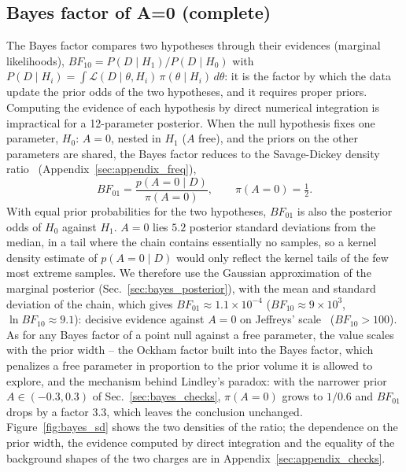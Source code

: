 \subsection{Bayes factor of A=0 (complete)}
The Bayes factor compares two hypotheses through their evidences (marginal likelihoods), $BF_{10}=P(D\mid H_1)/P(D\mid H_0)$ with $P(D\mid H_i)=\int\mathcal{L}(D\mid\theta,H_i)\,\pi(\theta\mid H_i)\,d\theta$: it is the factor by which the data update the prior odds of the two hypotheses, and it requires proper priors. Computing the evidence of each hypothesis by direct numerical integration is impractical for a 12-parameter posterior. When the null hypothesis fixes one parameter, $H_0$: $A=0$, nested in $H_1$ ($A$ free), and the priors on the other parameters are shared, the Bayes factor reduces to the Savage-Dickey density ratio~\cite{dickey1971} (Appendix~\ref{sec:appendix_freq}),
\[
BF_{01} = \frac{p(A=0\mid D)}{\pi(A=0)}, \qquad \pi(A=0)=\tfrac12 .
\]
With equal prior probabilities for the two hypotheses, $BF_{01}$ is also the posterior odds of $H_0$ against $H_1$. $A=0$ lies $5.2$ posterior standard deviations from the median, in a tail where the chain contains essentially no samples, so a kernel density estimate of $p(A=0\mid D)$ would only reflect the kernel tails of the few most extreme samples. We therefore use the Gaussian approximation of the marginal posterior (Sec.~\ref{sec:bayes_posterior}), with the mean and standard deviation of the chain, which gives $BF_{01}\approx1.1\times10^{-4}$ ($BF_{10}\approx9\times10^{3}$, $\ln BF_{10}\approx9.1$): decisive evidence against $A=0$ on Jeffreys' scale~\cite{jeffreys} ($BF_{10}>100$). As for any Bayes factor of a point null against a free parameter, the value scales with the prior width -- the Ockham factor built into the Bayes factor, which penalizes a free parameter in proportion to the prior volume it is allowed to explore, and the mechanism behind Lindley's paradox: with the narrower prior $A\in(-0.3,0.3)$ of Sec.~\ref{sec:bayes_checks}, $\pi(A=0)$ grows to $1/0.6$ and $BF_{01}$ drops by a factor $3.3$, which leaves the conclusion unchanged. Figure~\ref{fig:bayes_sd} shows the two densities of the ratio; the dependence on the prior width, the evidence computed by direct integration and the equality of the background shapes of the two charges are in Appendix~\ref{sec:appendix_checks}.

